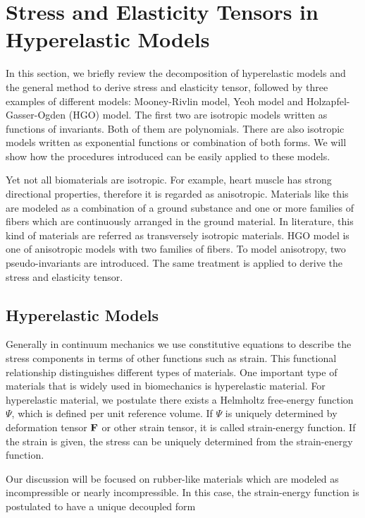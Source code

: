 \section{Stress and Elasticity Tensors in Hyperelastic Models} \label{general}
In this section, we briefly review the decomposition of hyperelastic models and the general method to derive stress and elasticity tensor, followed by three examples of different models: Mooney-Rivlin model, Yeoh model and Holzapfel-Gasser-Ogden (HGO) model. The first two are isotropic models written as functions of invariants. Both of them are polynomials. There are also isotropic models written as exponential functions or combination of both forms. We will show how the procedures introduced can be easily applied to these models.

Yet not all biomaterials are isotropic. For example, heart muscle has strong directional properties, therefore it is regarded as anisotropic. Materials like this are modeled as a combination of a ground substance and one or more families of fibers which are continuously arranged in the ground material. In literature, this kind of materials are referred as transversely isotropic materials. HGO model is one of anisotropic models with two families of fibers. To model anisotropy, two pseudo-invariants are introduced. The same treatment is applied to derive the stress and elasticity tensor.

%
\subsection{Hyperelastic Models}
Generally in continuum mechanics we use constitutive equations to describe the stress components in terms of other functions such as strain. This functional relationship distinguishes different types of materials. One important type of materials that is widely used in biomechanics is hyperelastic material. For hyperelastic material, we postulate there exists a Helmholtz free-energy function $\Psi$, which is defined per unit reference volume. If $\Psi$ is uniquely determined by deformation tensor $\bold{F}$ or other strain tensor, it is called strain-energy function. If the strain is given, the stress can be uniquely determined from the strain-energy function.  

Our discussion will be focused on rubber-like materials which are modeled as incompressible or nearly incompressible. In this case, the strain-energy function is postulated to have a unique decoupled form

